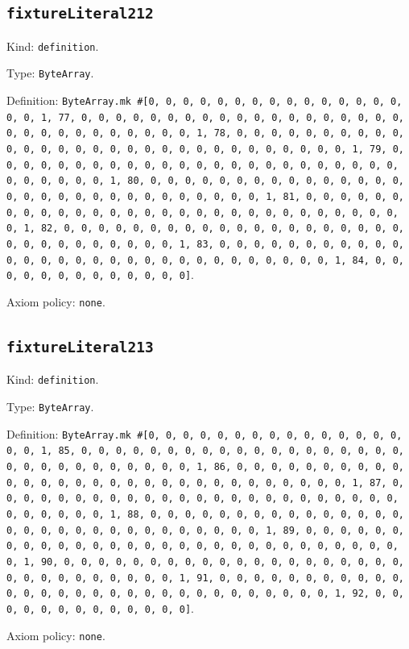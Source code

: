 \documentclass[11pt]{article}
\begin{document}
\subsection*{\texttt{fixtureLiteral212}}
\noindent Kind: \texttt{definition}.\par
\noindent Type: \texttt{ByteArray}.\par
\noindent Definition: \texttt{ByteArray.mk \#[0, 0, 0, 0, 0, 0, 0, 0, 0, 0, 0, 0, 0, 0, 0, 0, 0, 1, 77, 0, 0, 0, 0, 0, 0, 0, 0, 0, 0, 0, 0, 0, 0, 0, 0, 0, 0, 0, 0, 0, 0, 0, 0, 0, 0, 0, 0, 0, 0, 1, 78, 0, 0, 0, 0, 0, 0, 0, 0, 0, 0, 0, 0, 0, 0, 0, 0, 0, 0, 0, 0, 0, 0, 0, 0, 0, 0, 0, 0, 0, 0, 1, 79, 0, 0, 0, 0, 0, 0, 0, 0, 0, 0, 0, 0, 0, 0, 0, 0, 0, 0, 0, 0, 0, 0, 0, 0, 0, 0, 0, 0, 0, 0, 1, 80, 0, 0, 0, 0, 0, 0, 0, 0, 0, 0, 0, 0, 0, 0, 0, 0, 0, 0, 0, 0, 0, 0, 0, 0, 0, 0, 0, 0, 0, 0, 1, 81, 0, 0, 0, 0, 0, 0, 0, 0, 0, 0, 0, 0, 0, 0, 0, 0, 0, 0, 0, 0, 0, 0, 0, 0, 0, 0, 0, 0, 0, 0, 1, 82, 0, 0, 0, 0, 0, 0, 0, 0, 0, 0, 0, 0, 0, 0, 0, 0, 0, 0, 0, 0, 0, 0, 0, 0, 0, 0, 0, 0, 0, 0, 1, 83, 0, 0, 0, 0, 0, 0, 0, 0, 0, 0, 0, 0, 0, 0, 0, 0, 0, 0, 0, 0, 0, 0, 0, 0, 0, 0, 0, 0, 0, 0, 1, 84, 0, 0, 0, 0, 0, 0, 0, 0, 0, 0, 0, 0, 0]}.\par
\noindent Axiom policy: \texttt{none}.\par
\subsection*{\texttt{fixtureLiteral213}}
\noindent Kind: \texttt{definition}.\par
\noindent Type: \texttt{ByteArray}.\par
\noindent Definition: \texttt{ByteArray.mk \#[0, 0, 0, 0, 0, 0, 0, 0, 0, 0, 0, 0, 0, 0, 0, 0, 0, 1, 85, 0, 0, 0, 0, 0, 0, 0, 0, 0, 0, 0, 0, 0, 0, 0, 0, 0, 0, 0, 0, 0, 0, 0, 0, 0, 0, 0, 0, 0, 0, 1, 86, 0, 0, 0, 0, 0, 0, 0, 0, 0, 0, 0, 0, 0, 0, 0, 0, 0, 0, 0, 0, 0, 0, 0, 0, 0, 0, 0, 0, 0, 0, 1, 87, 0, 0, 0, 0, 0, 0, 0, 0, 0, 0, 0, 0, 0, 0, 0, 0, 0, 0, 0, 0, 0, 0, 0, 0, 0, 0, 0, 0, 0, 0, 1, 88, 0, 0, 0, 0, 0, 0, 0, 0, 0, 0, 0, 0, 0, 0, 0, 0, 0, 0, 0, 0, 0, 0, 0, 0, 0, 0, 0, 0, 0, 0, 1, 89, 0, 0, 0, 0, 0, 0, 0, 0, 0, 0, 0, 0, 0, 0, 0, 0, 0, 0, 0, 0, 0, 0, 0, 0, 0, 0, 0, 0, 0, 0, 1, 90, 0, 0, 0, 0, 0, 0, 0, 0, 0, 0, 0, 0, 0, 0, 0, 0, 0, 0, 0, 0, 0, 0, 0, 0, 0, 0, 0, 0, 0, 0, 1, 91, 0, 0, 0, 0, 0, 0, 0, 0, 0, 0, 0, 0, 0, 0, 0, 0, 0, 0, 0, 0, 0, 0, 0, 0, 0, 0, 0, 0, 0, 0, 1, 92, 0, 0, 0, 0, 0, 0, 0, 0, 0, 0, 0, 0, 0]}.\par
\noindent Axiom policy: \texttt{none}.\par
\end{document}
